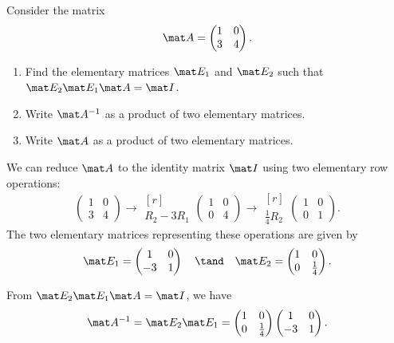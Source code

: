 \begin{problem}
    Consider the matrix \[\mat A = \begin{pmatrix}1 & 0 \\ 3 & 4\end{pmatrix}.\]
    \begin{enumerate}
        \item Find the elementary matrices $\mat E_1$ and $\mat E_2$ such that $\mat E_2 \mat E_1 \mat A = \mat I$.
        \item Write $\mat A^{-1}$ as a product of two elementary matrices.
        \item Write $\mat A$ as a product of two elementary matrices.
    \end{enumerate}
\end{problem}
\begin{solution}
    \begin{ppart}
        We can reduce $\mat A$ to the identity matrix $\mat I$ using two elementary row operations: \[\begin{pmatrix}1 & 0 \\ 3 & 4\end{pmatrix} \rightarrow \begin{matrix}[r] \\ \scriptstyle R_2 - 3R_1\end{matrix} \begin{pmatrix}1 & 0 \\ 0 & 4 \end{pmatrix} \rightarrow \begin{matrix}[r] \\ \scriptstyle \frac14 R_2\end{matrix} \begin{pmatrix}1 & 0 \\ 0 & 1\end{pmatrix}.\] The two elementary matrices representing these operations are given by \[\mat E_1 = \begin{pmatrix}1 & 0 \\ -3 & 1\end{pmatrix} \quad \tand \quad \mat E_2 = \begin{pmatrix}1 & 0 \\ 0 & \frac14\end{pmatrix}.\]
    \end{ppart}
    \begin{ppart}
        From $\mat E_2 \mat E_1 \mat A = \mat I$, we have \[\mat A^{-1} = \mat E_2 \mat E_1 = \begin{pmatrix}1 & 0 \\ 0 & \frac14\end{pmatrix} \begin{pmatrix}1 & 0 \\ -3 & 1\end{pmatrix}.\]

\end{ppart}
\end{solution}
